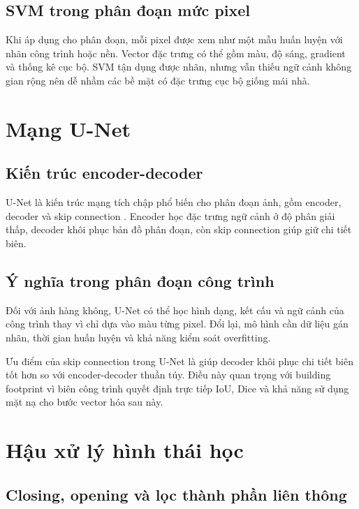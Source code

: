 \documentclass[12pt,a4paper]{report}
\begin{document}
\subsection{SVM trong phân đoạn mức pixel}

Khi áp dụng cho phân đoạn, mỗi pixel được xem như một mẫu huấn luyện với nhãn công trình hoặc nền. Vector đặc trưng có thể gồm màu, độ sáng, gradient và thống kê cục bộ. SVM tận dụng được nhãn, nhưng vẫn thiếu ngữ cảnh không gian rộng nên dễ nhầm các bề mặt có đặc trưng cục bộ giống mái nhà.

\section{Mạng U-Net}

\subsection{Kiến trúc encoder-decoder}

U-Net là kiến trúc mạng tích chập phổ biến cho phân đoạn ảnh, gồm encoder, decoder và skip connection \cite{ronneberger2015unet}. Encoder học đặc trưng ngữ cảnh ở độ phân giải thấp, decoder khôi phục bản đồ phân đoạn, còn skip connection giúp giữ chi tiết biên.

\subsection{Ý nghĩa trong phân đoạn công trình}

Đối với ảnh hàng không, U-Net có thể học hình dạng, kết cấu và ngữ cảnh của công trình thay vì chỉ dựa vào màu từng pixel. Đổi lại, mô hình cần dữ liệu gán nhãn, thời gian huấn luyện và khả năng kiểm soát overfitting.

Ưu điểm của skip connection trong U-Net là giúp decoder khôi phục chi tiết biên tốt hơn so với encoder-decoder thuần túy. Điều này quan trọng với building footprint vì biên công trình quyết định trực tiếp IoU, Dice và khả năng sử dụng mặt nạ cho bước vector hóa sau này.

\section{Hậu xử lý hình thái học}

\subsection{Closing, opening và lọc thành phần liên thông}
\end{document}

